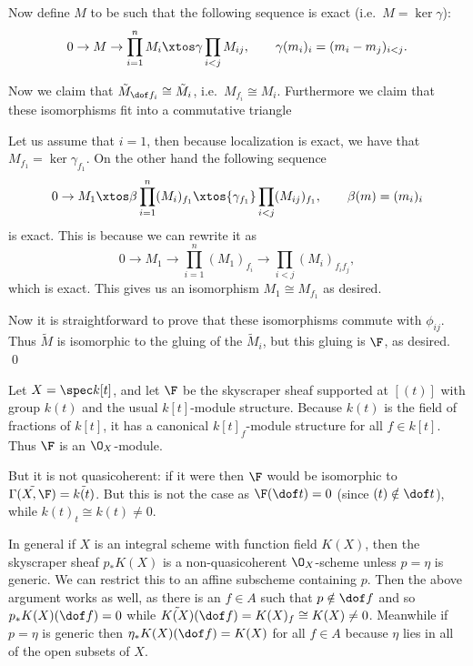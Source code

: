     Now define $M$ to be such that the following sequence is exact (i.e.\ $M=\ker\gamma$):
    $$ 0 \to M \to \prod_{i=1}^n M_i \xtos\gamma \prod_{i<j}M_{ij},\qquad \gamma(m_i)_i = (m_i-m_j)_{i<j} . $$

    Now we claim that $\tilde M_{\dof f_i}\cong\tilde M_i$, i.e.\ $M_{f_i}\cong M_i$.
    Furthermore we claim that these isomorphisms fit into a commutative triangle


    Let us assume that $i=1$, then because localization is exact, we have that $M_{f_1}=\ker\gamma_{f_1}$.
    On the other hand the following sequence
    $$ 0 \to M_1 \xtos\beta \prod_{i=1}^n(M_i)_{f_1} \xtos{\gamma_{f_1}} \prod_{i<j}(M_{ij})_{f_1},\qquad \beta(m)=(m_i)_i $$
    is exact.
    This is because we can rewrite it as
    $$ 0 \to M_1 \to \prod_{i=1}^n(M_1)_{f_i} \to \prod_{i<j}(M_i)_{f_if_j} , $$
    which is exact.
    This gives us an isomorphism $M_1\cong M_{f_1}$ as desired.

    Now it is straightforward to prove that these isomorphisms commute with $\phi_{ij}$.
    Thus $\tilde M$ is isomorphic to the gluing of the $\tilde M_i$, but this gluing is $\F$, as desired.
    \qed

\eproof

\bexam

    Let $X=\spec k[t]$, and let $\F$ be the skyscraper sheaf supported at $[(t)]$ with group $k(t)$ and the usual $k[t]$-module structure.
    Because $k(t)$ is the field of fractions of $k[t]$, it has a canonical $k[t]_f$-module structure for all $f\in k[t]$.
    Thus $\F$ is an $\O_X$-module.

    But it is not quasicoherent: if it were then $\F$ would be isomorphic to $\tilde{\Gamma(X,\F)}=\tilde{k(t)}$.
    But this is not the case as $\F(\dof t)=0$ (since $(t)\notin\dof t$), while $k(t)_t\cong k(t)\neq0$.

    In general if $X$ is an integral scheme with function field $K(X)$, then the skyscraper sheaf $p_*K(X)$ is a non-quasicoherent $\O_X$-scheme unless $p=\eta$ is generic.
    We can restrict this to an affine subscheme containing $p$.
    Then the above argument works as well, as there is an $f\in A$ such that $p\notin\dof f$ and so $p_*K(X)(\dof f)=0$ while $\tilde{K(X)}(\dof f)=K(X)_f\cong K(X)\neq0$.
    Meanwhile if $p=\eta$ is generic then $\eta_*K(X)(\dof f)=K(X)$ for all $f\in A$ because $\eta$ lies in all of the open subsets of $X$.

